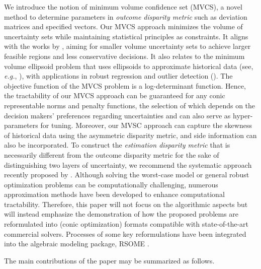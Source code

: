 \documentclass[opre, blindrev]{informs4}
\newcommand{\1}[1]{\mathds{1}{\left(#1\right)}}
\begin{document}
We introduce the notion of minimum volume confidence set (MVCS), a novel method to determine parameters in \emph{outcome disparity metric} such as deviation matrices and specified vectors. Our MVCS approach minimizes the volume of uncertainty sets while maintaining statistical principles as constraints. It aligns with the works by \cite{hong2021learning}, aiming for smaller volume uncertainty sets to achieve larger feasible regions and less conservative decisions.
It also relates to the minimum volume ellipsoid problem that uses ellipsoids to approximate historical data (see, \textit{e.g.}, \citealt{sun2004computation, mittal2022finding}), with applications in robust regression and outlier detection (\citealt{ahipacsaouglu2015fast, van2009minimum}). The objective function of the MVCS problem is a log-determinant function. Hence, the tractability of our MVCS approach can be guaranteed for any conic representable norms and penalty functions, the selection of which depends on the decision makers' preferences regarding uncertainties and can also serve as hyper-parameters for tuning. 
Moreover, our MVSC approach can capture the skewness of historical data using the asymmetric disparity metric, and side information can also be incorporated. 
To construct the \textit{estimation disparity metric} that is necessarily different from the outcome disparity metric for the sake of distinguishing two layers of uncertainty, we recommend the systematic approach recently proposed by \citealt{Zhu_Xie_Sim_2021joint}.  
Although solving the worst-case model or general robust optimization problems can be computationally challenging, numerous approximation methods have been developed to enhance computational tractability. Therefore, this paper will not focus on the algorithmic aspects but will instead emphasize the demonstration of how the proposed problems are reformulated into (conic optimization) formats compatible with state-of-the-art commercial solvers. Processes of some key reformulations have been integrated into the algebraic modeling package, RSOME \citep{Chen_Xiong_rsome}.

The main contributions of the paper may be summarized as follows.
\end{document}
